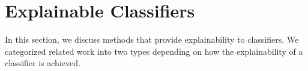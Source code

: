 \chapter{Explainable Classifiers}\label{sec-explainable-classifier}

In this section, we discuss methods that provide explainability to classifiers. We categorized related work into two types depending on how the explainability of a classifier is achieved. 







